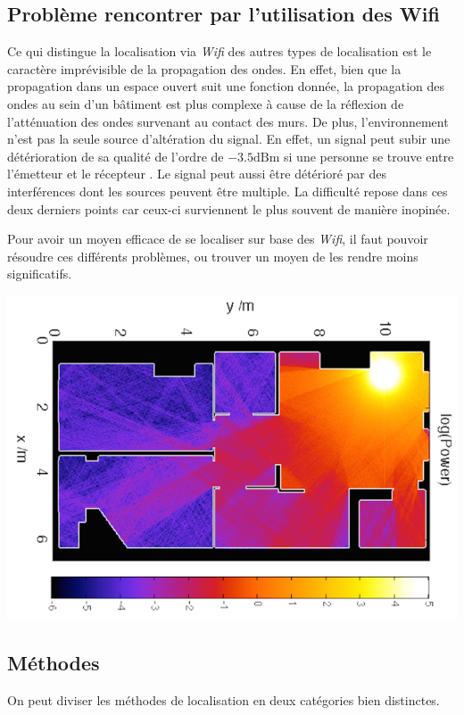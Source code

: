 \documentclass[10pt,journal,compsoc]{IEEEtran}
\newcommand{\dBm}{\text{dBm}}
\begin{document}
  \subsection{Problème rencontrer par l'utilisation des Wifi}
    Ce qui distingue la localisation via \textit{Wifi} des autres types de localisation est le caractère imprévisible de la propagation des ondes.
	En effet, bien que la propagation dans un espace ouvert suit une fonction donnée, la propagation des ondes au sein d'un bâtiment est plus complexe
	à cause de la réflexion de l'atténuation des ondes survenant au contact des murs. De plus, l'environnement n'est pas la seule source d'altération
	du signal. En effet, un signal peut subir une détérioration de sa qualité de l'ordre de $-3.5 \dBm$ si une personne se trouve entre l'émetteur et le
	récepteur \cite{ETH}. Le signal peut aussi être détérioré par des interférences dont les sources peuvent être multiple. La difficulté repose dans
	ces deux derniers points car ceux-ci surviennent le plus souvent de manière inopinée.

    Pour avoir un moyen efficace de se localiser sur base des \textit{Wifi}, il faut pouvoir résoudre ces différents problèmes, ou trouver un moyen de
	les rendre moins significatifs.
    \begin{center}
      \includegraphics[scale=0.3]{images/wifi-propagation.png}
    \end{center}
  \subsection{Méthodes}
    On peut diviser les méthodes de localisation en deux catégories bien distinctes.
\end{document}
